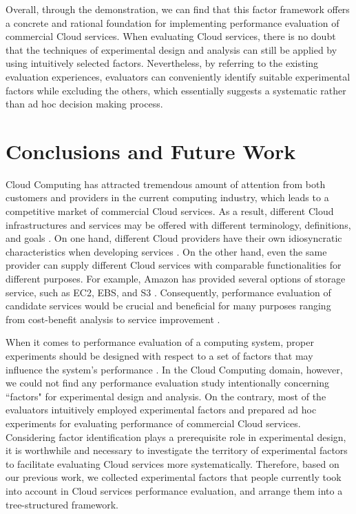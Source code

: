\documentclass[10pt, conference, compsocconf]{IEEEtran}
\begin{document}
Overall, through the demonstration, we can find that this factor framework offers a concrete and rational foundation for implementing performance evaluation of commercial Cloud services. When evaluating Cloud services, there is no doubt that the techniques of experimental design and analysis can still be applied by using intuitively selected factors. Nevertheless, by referring to the existing evaluation experiences, evaluators can conveniently identify suitable experimental factors while excluding the others, which essentially suggests a systematic rather than ad hoc decision making process.















\section{Conclusions and Future Work}
\label{V}
Cloud Computing has attracted tremendous amount of attention from both customers and providers in the current computing industry, which leads to a competitive market of commercial Cloud services. As a result, different Cloud infrastructures and services may be offered with different terminology, definitions, and goals \cite{Prodan_Ostermann_2009}. On one hand, different Cloud providers have their own idiosyncratic characteristics when developing services \cite{Li_Yang_2010}. On the other hand, even the same provider can supply different Cloud services with comparable functionalities for different purposes. For example, Amazon has provided several options of storage service, such as EC2, EBS, and S3 \cite{Chiu_Agrawal_2010}. Consequently, performance evaluation of candidate services would be crucial and beneficial for many purposes ranging from cost-benefit analysis to service improvement \cite{Li_Yang_2010}.

When it comes to performance evaluation of a computing system, proper experiments should be designed with respect to a set of factors that may influence the system's performance \cite{Jain_1991}. In the Cloud Computing domain, however, we could not find any performance evaluation study intentionally concerning ``factors" for experimental design and analysis. On the contrary, most of the evaluators intuitively employed experimental factors and prepared ad hoc experiments for evaluating performance of commercial Cloud services. Considering factor identification plays a prerequisite role in experimental design, it is worthwhile and necessary to investigate the territory of experimental factors to facilitate evaluating Cloud services more systematically. Therefore, based on our previous work, we collected experimental factors that people currently took into account in Cloud services performance evaluation, and arrange them into a tree-structured framework.
\end{document}
